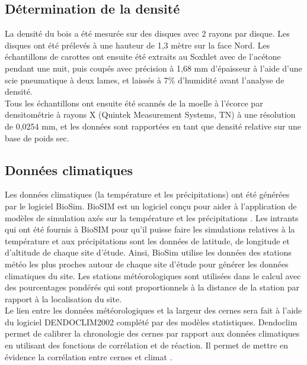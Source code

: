 \documentclass{report}
\begin{document}
\subsection*{Détermination de la densité}\label{densité}
La densité du bois a été mesurée sur des disques avec 2 rayons par disque. Les disques ont été prélevés à une hauteur de 1,3 mètre sur la face Nord. Les échantillons de carottes ont ensuite été extraits au Soxhlet avec de l'acétone pendant une nuit, puis coupés avec précision à 1,68 mm d'épaisseur à l'aide d'une scie pneumatique à deux lames, et laissés à 7\% d'humidité avant l'analyse de densité.\\
 
Tous les échantillons ont ensuite été scannés de la moelle à l'écorce par densitométrie à rayons X (Quintek Measurement Systems, TN) à une résolution de 0,0254 mm, et les données sont rapportées en tant que densité relative sur une base de poids sec. %


\subsection*{Données climatiques}
Les données climatiques (la température et les précipitations) ont été générées par le logiciel BioSim. BioSIM est un logiciel conçu pour aider à l'application de modèles de simulation axés sur la température et les précipitations \citep{Regniere2014}. Les intrants qui ont été fournis à BioSIM pour qu'il puisse faire les simulations relatives à la température et aux précipitations sont les données de latitude, de longitude et d'altitude de chaque site d'étude. Ainsi, BioSim utilise les données des stations météo les plus proches autour de chaque site d'étude pour générer les données climatiques du site. Les stations météorologiques sont utilisées dans le calcul avec des pourcentages pondérés qui sont proportionnels à la distance de la station par rapport à la localisation du site.\\ 

Le lien entre les données météorologiques et la largeur des cernes sera fait à l'aide du logiciel DENDOCLIM2002 complété par des modèles statistiques. Dendoclim permet de calibrer la chronologie des cernes par rapport aux données climatiques en utilisant des fonctions de corrélation et de réaction. Il permet de mettre en évidence la corrélation entre cernes et climat \citep{Biondi2004}. 
\end{document}
